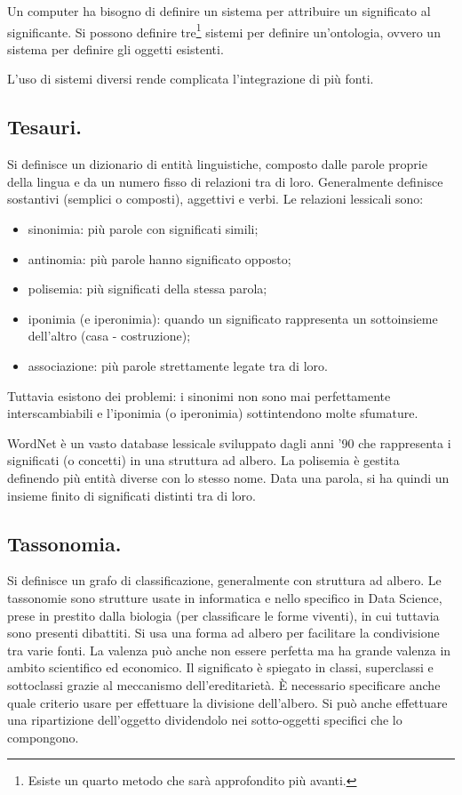\documentclass[11pt]{article}
\begin{document}
\begin{multicols}{2}
Un computer ha bisogno di definire un sistema per attribuire un significato al significante.
Si possono definire tre\footnote{Esiste un quarto metodo che sarà approfondito più avanti.} sistemi per definire un'ontologia, ovvero un sistema per definire gli oggetti esistenti.

L'uso di sistemi diversi rende complicata l'integrazione di più fonti.

\subsection{Tesauri.}
Si definisce un dizionario di entità linguistiche, composto dalle parole proprie della lingua e da un numero fisso di relazioni tra di loro.
Generalmente definisce sostantivi (semplici o composti), aggettivi e verbi.
Le relazioni lessicali sono:
\begin{itemize}
  \item sinonimia: più parole con significati simili;
  \item antinomia: più parole hanno significato opposto;
  \item polisemia: più significati della stessa parola;
  \item iponimia (e iperonimia): quando un significato rappresenta un sottoinsieme dell'altro (casa - costruzione);
  \item associazione: più parole strettamente legate tra di loro.
\end{itemize}
Tuttavia esistono dei problemi: i sinonimi non sono mai perfettamente interscambiabili e l'iponimia (o iperonimia) sottintendono molte sfumature.

WordNet è un vasto database lessicale sviluppato dagli anni '90 che rappresenta i significati (o concetti) in una struttura ad albero.
La polisemia è gestita definendo più entità diverse con lo stesso nome.
Data una parola, si ha quindi un insieme finito di significati distinti tra di loro.

\subsection{Tassonomia.}
Si definisce un grafo di classificazione, generalmente con struttura ad albero.
Le tassonomie sono strutture usate in informatica e nello specifico in Data Science, prese in prestito dalla biologia (per classificare le forme viventi), in cui tuttavia sono presenti dibattiti.
Si usa una forma ad albero per facilitare la condivisione tra varie fonti.
La valenza può anche non essere perfetta ma ha grande valenza in ambito scientifico ed economico.
Il significato è spiegato in classi, superclassi e sottoclassi grazie al meccanismo dell'ereditarietà.
È necessario specificare anche quale criterio usare per effettuare la divisione dell'albero.
Si può anche effettuare una ripartizione dell'oggetto dividendolo nei sotto-oggetti specifici che lo compongono.


\end{multicols}
\end{document}
